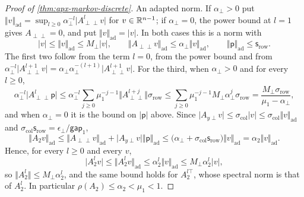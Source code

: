 \begin{proof}[Proof of \cref{thm:apx-markov-discrete}]
An adapted norm. If $\alpha_\perp>0$ put $\Vert v\Vert_{\mathrm{ad}}=\sup_{l\ge0}\alpha_\perp^{-l}\lvert A_{\perp\perp}^lv\rvert$ for $v\in\mathbb{R}^{n-1}$; if $\alpha_\perp=0$, the power bound at $l=1$ gives $A_{\perp\perp}=0$, and put $\Vert v\Vert_{\mathrm{ad}}=\lvert v\rvert$. In both cases this is a norm with
\begin{equation}\label{eq:apx-markov-adapted}
\lvert v\rvert\le\Vert v\Vert_{\mathrm{ad}}\le M_\perp\lvert v\rvert,\qquad\Vert A_{\perp\perp}v\Vert_{\mathrm{ad}}\le\alpha_\perp\Vert v\Vert_{\mathrm{ad}},\qquad\Vert\mathsf p\Vert_{\mathrm{ad}}\le\mathsf s_{\mathrm{row}} .
\end{equation}
The first two follow from the term $l=0$, from the power bound and from $\alpha_\perp^{-l}\lvert A_{\perp\perp}^{l+1}v\rvert=\alpha_\perp\alpha_\perp^{-(l+1)}\lvert A_{\perp\perp}^{l+1}v\rvert$. For the third, when $\alpha_\perp>0$ and for every $l\ge0$,
\begin{equation*}
\alpha_\perp^{-l}\lvert A_{\perp\perp}^l\mathsf p\rvert\le\alpha_\perp^{-l}\sum_{j\ge0}\mu_1^{-j-1}\Vert A_{\perp\perp}^{l+j}\Vert\sigma_{\mathrm{row}}\le\sum_{j\ge0}\mu_1^{-j-1}M_\perp\alpha_\perp^j\sigma_{\mathrm{row}}=\frac{M_\perp\sigma_{\mathrm{row}}}{\mu_1-\alpha_\perp},
\end{equation*}
and when $\alpha_\perp=0$ it is the bound on $\lvert\mathsf p\rvert$ above. Since $\lvert A_{y\perp}v\rvert\le\sigma_{\mathrm{col}}\lvert v\rvert\le\sigma_{\mathrm{col}}\Vert v\Vert_{\mathrm{ad}}$ and $\sigma_{\mathrm{col}}\mathsf s_{\mathrm{row}}=\epsilon_\perp/\mathsf{gap}_1$,
\begin{equation*}
\Vert A_2v\Vert_{\mathrm{ad}}\le\Vert A_{\perp\perp}v\Vert_{\mathrm{ad}}+\lvert A_{y\perp}v\rvert\Vert\mathsf p\Vert_{\mathrm{ad}}\le\bigl(\alpha_\perp+\sigma_{\mathrm{col}}\mathsf s_{\mathrm{row}}\bigr)\Vert v\Vert_{\mathrm{ad}}=\alpha_2\Vert v\Vert_{\mathrm{ad}} .
\end{equation*}
Hence, for every $l\ge0$ and every $v$,
\begin{equation}\label{eq:apx-markov-power}
\lvert A_2^lv\rvert\le\Vert A_2^lv\Vert_{\mathrm{ad}}\le\alpha_2^l\Vert v\Vert_{\mathrm{ad}}\le M_\perp\alpha_2^l\lvert v\rvert ,
\end{equation}
so $\Vert A_2^l\Vert\le M_\perp\alpha_2^l$, and the same bound holds for $A_2^{l\top}$, whose spectral norm is that of $A_2^l$. In particular $\rho(A_2)\le\alpha_2<\mu_1<1$.


\end{proof}
